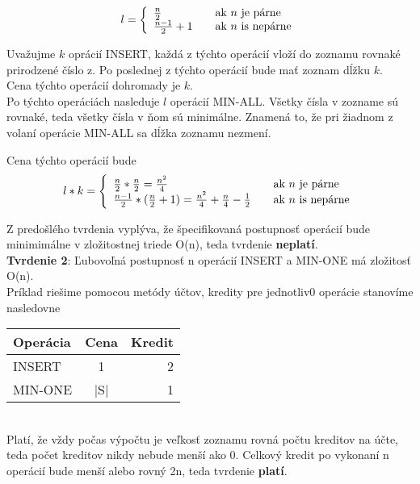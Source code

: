 \documentclass[paper=a4, fontsize=11pt]{scrartcl} %
\numberwithin{equation}{section} %
\numberwithin{figure}{section} %
\numberwithin{table}{section} %
\begin{document}
\[ l = \left\{ 
  \begin{array}{l l}
    \frac{n}{2} & \quad \text{ak $n$ je párne}\\
    \frac{n-1}{2} + 1 & \quad \text{ak $n$ is nepárne}
  \end{array} \right.\]


Uvažujme $k$ oprácií INSERT, každá z týchto operácií vloží do zoznamu rovnaké prirodzené číslo z.
Po poslednej z týchto operácií bude mať zoznam dĺžku $k$. \\

Cena týchto operácií dohromady je $k$. \\

Po týchto operáciách nasleduje $l$ operácií MIN-ALL.
Všetky čísla v zozname sú rovnaké, teda všetky čísla v ňom sú minimálne.
Znamená to, že pri žiadnom z volaní operácie MIN-ALL sa dĺžka zoznamu nezmení.


Cena týchto operácií bude 
\[ l*k = \left\{ 
  \begin{array}{l l}
    \frac{n}{2}* \frac{n}{2} = \frac{n^2}{4} & \quad \text{ak $n$ je párne}\\
    \frac{n-1}{2}* (\frac{n}{2} + 1) = \frac{n^2}{4} + \frac{n}{4} - \frac{1}{2} & \quad \text{ak $n$ is nepárne}
  \end{array} \right.\]

Z predošlého tvrdenia vyplýva, že špecifikovaná postupnosť operácií bude minimimálne v zložitostnej triede O(n), teda tvrdenie \textbf{neplatí}. \\

\textbf{Tvrdenie 2}: Ľubovoľná postupnosť n operácií INSERT  a MIN-ONE má zložitosť O(n). \\
Príklad riešime pomocou metódy účtov, kredity pre jednotliv0 operácie stanovíme nasledovne \\

  \begin{tabular}{ | l | c | r | }
    \hline
    Operácia & Cena & Kredit \\	
    \hline
    INSERT & 1 & 2 \\ 
    MIN-ONE & |S| & 1 \\
    \hline
  \end{tabular}\\

Platí, že vždy počas výpočtu je veľkosť zoznamu rovná počtu kreditov na účte, teda počet kreditov nikdy nebude menší ako 0.
Celkový kredit po vykonaní n operácií bude menší alebo rovný 2n, teda tvrdenie \textbf{platí}. \\
\end{document}
